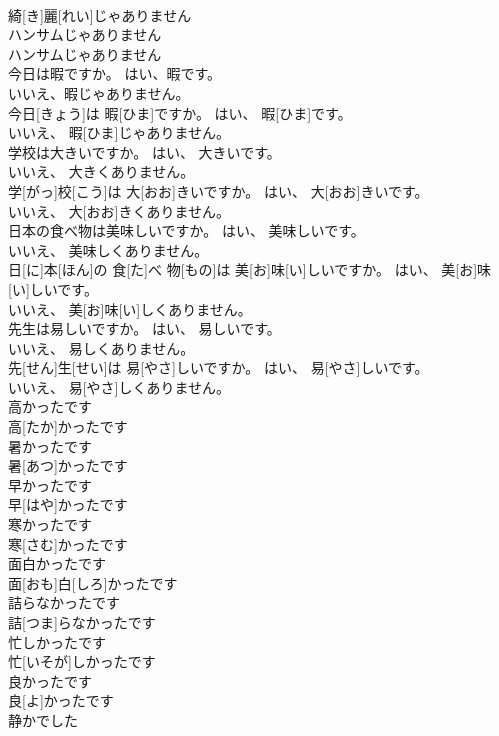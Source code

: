 \documentclass[8pt]{extreport}
\begin{document}
\begin{CJK}{UTF8}{min}
\\	綺[き]麗[れい]じゃありません
\\	ハンサムじゃありません	
\\	ハンサムじゃありません
\\	今日は暇ですか。 はい、暇です。 
\\	いいえ、暇じゃありません。	
\\	今日[きょう]は 暇[ひま]ですか。 はい、 暇[ひま]です。 
\\	いいえ、 暇[ひま]じゃありません。
\\	学校は大きいですか。 はい、 大きいです。 
\\	いいえ、 大きくありません。	
\\	学[がっ]校[こう]は 大[おお]きいですか。 はい、 大[おお]きいです。 
\\	いいえ、 大[おお]きくありません。
\\	日本の食べ物は美味しいですか。 はい、 美味しいです。 
\\	いいえ、 美味しくありません。	
\\	日[に]本[ほん]の 食[た]べ 物[もの]は 美[お]味[い]しいですか。 はい、 美[お]味[い]しいです。 
\\	いいえ、 美[お]味[い]しくありません。
\\	先生は易しいですか。 はい、 易しいです。 
\\	いいえ、 易しくありません。	
\\	先[せん]生[せい]は 易[やさ]しいですか。 はい、 易[やさ]しいです。 
\\	いいえ、 易[やさ]しくありません。
\\	高かったです	
\\	高[たか]かったです
\\	暑かったです	
\\	暑[あつ]かったです
\\	早かったです	
\\	早[はや]かったです
\\	寒かったです	
\\	寒[さむ]かったです
\\	面白かったです	
\\	面[おも]白[しろ]かったです
\\	詰らなかったです	
\\	詰[つま]らなかったです
\\	忙しかったです	
\\	忙[いそが]しかったです
\\	良かったです	
\\	良[よ]かったです
\\	静かでした	

\end{CJK}
\end{document}
